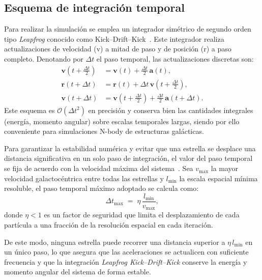 \subsection{Esquema de integración temporal}\label{subsec:esquema-de-integracion-temporal-(leapfrog-kick--drift--kick).}
Para realizar la simulación se emplea un integrador simétrico de segundo orden tipo \emph{Leapfrog} conocido como Kick--Drift--Kick~\cite{hockney1988,saha1992,springel2005}.
Este integrador realiza actualizaciones de velocidad (v) a mitad de paso y de posición (r) a paso completo.
Denotando por \(\Delta t\) el paso temporal, las actualizaciones discretas son:
\[
    \begin{aligned}
        \mathbf{v}\!\left(t+\tfrac{\Delta t}{2}\right) &= \mathbf{v}(t) + \tfrac{\Delta t}{2}\,\mathbf{a}(t), \\[6pt]
        \mathbf{r}(t+\Delta t) &= \mathbf{r}(t) + \Delta t \,\mathbf{v}\!\left(t+\tfrac{\Delta t}{2}\right), \\[6pt]
        \mathbf{v}(t+\Delta t) &= \mathbf{v}\!\left(t+\tfrac{\Delta t}{2}\right) + \tfrac{\Delta t}{2}\,\mathbf{a}(t+\Delta t).
    \end{aligned}
\]
Este esquema es \(\mathcal{O}(\Delta t^2)\) en precisión y conserva bien las cantidades integrales (energía, momento angular) sobre escalas temporales largas, siendo por ello conveniente para simulaciones N-body de estructuras galácticas.


Para garantizar la estabilidad numérica y evitar que una estrella se desplace una distancia significativa en un solo paso de integración, el valor del paso temporal se fija de acuerdo con la velocidad máxima del sistema~\cite{dehnen2011,hockney1988}.
Sea \(v_{\max}\) la mayor velocidad galactocéntrica entre todas las estrellas y \(l_{\min}\) la escala espacial mínima resoluble, el paso temporal máximo adoptado se calcula como:
\[
    \Delta t_{\max} \;=\; \eta \, \frac{l_{\min}}{v_{\max}},
\]
donde \(\eta < 1\) es un factor de seguridad que limita el desplazamiento de cada partícula a una fracción de la resolución espacial en cada iteración.

De este modo, ninguna estrella puede recorrer una distancia superior a \(\eta\,l_{\min}\) en un único paso, lo que asegura que las aceleraciones se actualicen con suficiente frecuencia y que la integración \emph{Leapfrog Kick–Drift–Kick} conserve la energía y momento angular del sistema de forma estable.

